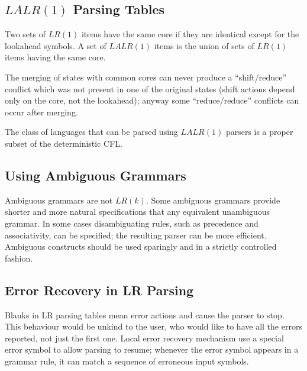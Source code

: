 \subsection{$LALR(1)$ Parsing Tables}
Two sets of $LR(1)$ items have the same core if they are identical except for the lookahead symbols.
A set of $LALR(1)$ items is the union of sets of $LR(1)$ items having the same core.

The merging of states with common cores can never produce a ``shift/reduce'' conflict which was not present in one of the original states (shift actions depend only on the core, not the lookahead); anyway some ``reduce/reduce'' conflicts can occur after merging.

The class of languages that can be parsed using $LALR(1)$ parsers is a proper subset of the deterministic CFL.

\subsection{Using Ambiguous Grammars}
Ambiguous grammars are not $LR(k)$.
Some ambiguous grammars provide shorter and more natural specifications that any equivalent unambiguous grammar.
In some cases disambiguating rules, such as precedence and associativity, can be specified; the resulting parser can be more efficient.
Ambiguous constructs should be used sparingly and in a strictly controlled fashion.

\subsection{Error Recovery in LR Parsing}
Blanks in LR parsing tables mean error actions and cause the parser to stop.
This behaviour would be unkind to the user, who would like to have all the errors reported, not just the first one.
Local error recovery mechanism use a special error symbol to allow parsing to resume; whenever the error symbol appears in a grammar rule, it can match a sequence of erroneous input symbols.

